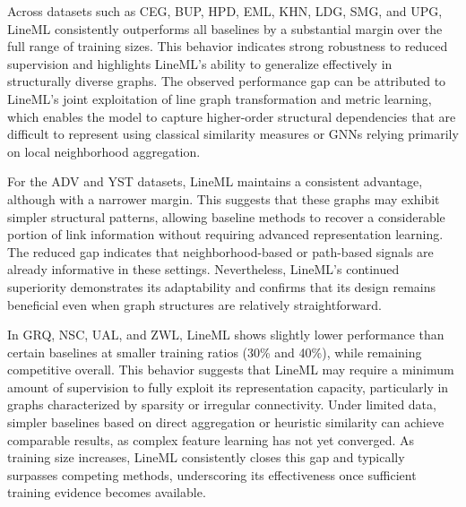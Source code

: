 \documentclass[pdflatex,sn-mathphys-num]{sn-jnl}%
\theoremstyle{thmstyleone}%
\theoremstyle{thmstyletwo}%
\theoremstyle{thmstylethree}%
\theoremstyle{plain} %
\theoremstyle{definition} %
\theoremstyle{remark} %
\theoremstyle{plain} %
\begin{document}
Across datasets such as CEG, BUP, HPD, EML, KHN, LDG, SMG, and UPG, LineML consistently outperforms all baselines by a substantial margin over the full range of training sizes. 
This behavior indicates strong robustness to reduced supervision and highlights LineML’s ability to generalize effectively in structurally diverse graphs. 
The observed performance gap can be attributed to LineML’s joint exploitation of line graph transformation and metric learning, which enables the model to capture higher-order structural dependencies that are difficult to represent using classical similarity measures or GNNs relying primarily on local neighborhood aggregation.

For the ADV and YST datasets, LineML maintains a consistent advantage, although with a narrower margin. 
This suggests that these graphs may exhibit simpler structural patterns, allowing baseline methods to recover a considerable portion of link information without requiring advanced representation learning. 
The reduced gap indicates that neighborhood-based or path-based signals are already informative in these settings. 
Nevertheless, LineML’s continued superiority demonstrates its adaptability and confirms that its design remains beneficial even when graph structures are relatively straightforward.

In GRQ, NSC, UAL, and ZWL, LineML shows slightly lower performance than certain baselines at smaller training ratios (30\% and 40\%), while remaining competitive overall. 
This behavior suggests that LineML may require a minimum amount of supervision to fully exploit its representation capacity, particularly in graphs characterized by sparsity or irregular connectivity. Under limited data, simpler baselines based on direct aggregation or heuristic similarity can achieve comparable results, as complex feature learning has not yet converged. As training size increases, LineML consistently closes this gap and typically surpasses competing methods, underscoring its effectiveness once sufficient training evidence becomes available.
\end{document}
